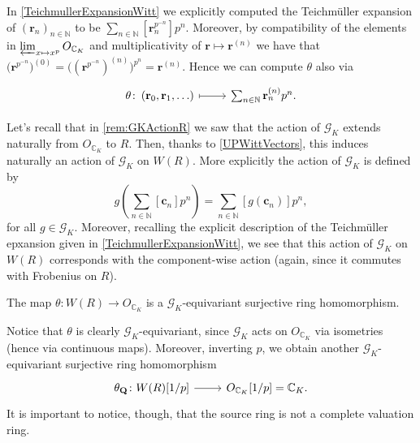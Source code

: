 \begin{rem}[]
	In \cref{TeichmullerExpansionWitt} we explicitly computed the Teichmüller
	expansion of $\left( \mathbf{r}_n \right)_{n \in \mathbb{N}}$
	to be $\sum_{n \in \mathbb{N} }^{  } [\mathbf{r}_n^{p^{-n}}] p^n$.
	Moreover, by compatibility of the elements in $\varprojlim_{x \mapsto x^p} O_{\mathbb{C}_K}$
	and multiplicativity of $\mathbf{r} \mapsto \mathbf{r}^{(n)}$
	we have that $\big( \mathbf{r}^{p^{-n}} \big)^{(0)} = \big( (\mathbf{r}^{p^{-n}})^{(n)} \big)^{p^n} =
	\mathbf{r}^{(n)}$.
	Hence we can compute $\theta$ also via
	\begin{equation*}
	\begin{tikzcd}
		\theta\colon 
		\left( \mathbf{r}_0, \mathbf{r}_1, \ldots \right)
		\arrow[r, "", mapsto] &
		\sum_{n \in \mathbb{N} }^{  } \mathbf{r}_n^{(n)} p^n
	.\end{tikzcd}
	\end{equation*}
\end{rem}


\begin{rem}[]\label{GKActionWR}
	Let's recall that in \cref{rem:GKActionR} we saw that
	the action of $\mathscr{G}_K$ extends naturally from $O_{\mathbb{C}_K}$ to $R$.
	Then, thanks to \cref{UPWittVectors}, this induces naturally
	an action of $\mathscr{G}_K$ on $W(R)$.
	More explicitly the action of $\mathscr{G}_K$ is defined by
	\begin{equation*}
		g \left( \sum_{n \in \mathbb{N} }^{  } [\mathbf{c}_n] p^n \right) =
		\sum_{n \in \mathbb{N} }^{  } [g(\mathbf{c}_n)] p^n
	,\end{equation*}
	for all $g \in \mathscr{G}_K$.
	Moreover, recalling the explicit description of the Teichmüller
	epxansion given in \cref{TeichmullerExpansionWitt}, we see that this
	action of $\mathscr{G}_K$ on $W(R)$ corresponds with the component-wise action
	(again, since it commutes with Frobenius on $R$).
\end{rem}


\begin{lem}
	The map $\theta\colon W(R) \to O_{\mathbb{C}_K}$ is a
	$\mathscr{G}_K$-equivariant surjective ring homomorphism.
\end{lem} 


\begin{rem}[]
	Notice that $\theta$ is clearly $\mathscr{G}_K$-equivariant,
	since $\mathscr{G}_K$ acts on $O_{\mathbb{C}_K}$
	via isometries (hence via continuous maps).
	Moreover, inverting $p$, we obtain another $\mathscr{G}_K$-equivariant surjective ring homomorphism
	\begin{equation*}
	\begin{tikzcd}[row sep = 0ex
		,/tikz/column 1/.append style={anchor=base east}
		,/tikz/column 2/.append style={anchor=base west}]
		\theta_{\mathbf{Q}}\colon W(R)[1/p] \arrow[r, "", rightarrow] &
		O_{\mathbb{C}_K}[1/p] = \mathbb{C}_K
	.\end{tikzcd}
	\end{equation*} 
	It is important to notice, though, that the source ring is not a complete valuation ring.
\end{rem}



